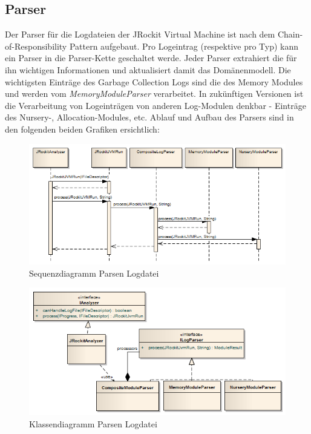 \subsection{Parser}
Der Parser für die Logdateien der JRockit Virtual Machine ist nach dem Chain-of-Responsibility Pattern\cite{wiki:chainOfResponsibilityPattern} aufgebaut. Pro Logeintrag (respektive pro Typ) kann ein Parser in die Parser-Kette geschaltet werde. Jeder Parser extrahiert die für ihn wichtigen Informationen und aktualisiert damit das Domänenmodell. Die wichtigsten Einträge des Garbage Collection Logs sind die des Memory Modules und werden vom \textit{MemoryModuleParser} verarbeitet. In zukünftigen Versionen ist die Verarbeitung von Logeinträgen von anderen Log-Modulen denkbar - Einträge des Nursery-, Allocation-Modules, etc. Ablauf und Aufbau des Parsers sind in den folgenden beiden Grafiken ersichtlich:

 \begin{figure}[H]
  	\centering
    	\includegraphics[width=16cm]{images/acitivity_parse_prozess}
        	\caption{Sequenzdiagramm Parsen Logdatei}
\end{figure}
 \begin{figure}[H]
  	\centering
    	\includegraphics[width=16cm]{images/jrockit_log_processing}
        	\caption{Klassendiagramm Parsen Logdatei}
\end{figure}

